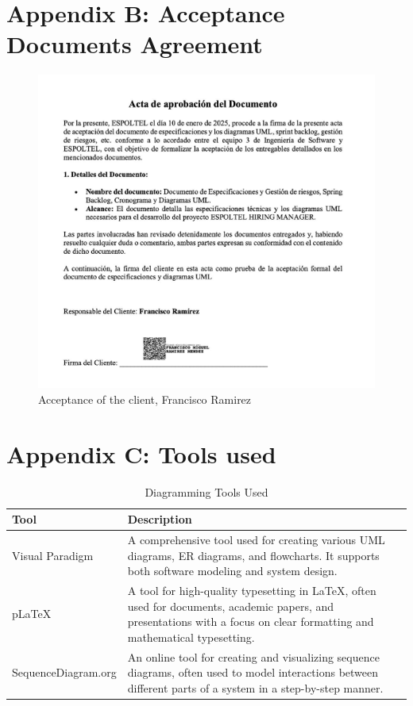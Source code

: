 \documentclass{scrreprt}
\begin{document}
\section{Appendix B: Acceptance Documents Agreement}
 \begin{figure}[H]
 	\centering  \small
 	\includegraphics[width=\textwidth]{Acceptance.jpeg} 
 	\caption{Acceptance of the client, Francisco Ramirez}
 	\label{fig:Acceptance}
 \end{figure}
\FloatBarrier 
\section{Appendix C: Tools used}
\begin{table}[H]
	\centering
	\begin{tabular}{|p{5cm}|p{5cm}|}
		\hline
		\textbf{Tool} & \textbf{Description} \\ \hline
		Visual Paradigm & A comprehensive tool used for creating various UML diagrams, ER diagrams, and flowcharts. It supports both software modeling and system design. \\ \hline
		pLaTeX & A tool for high-quality typesetting in LaTeX, often used for documents, academic papers, and presentations with a focus on clear formatting and mathematical typesetting. \\ \hline
		SequenceDiagram.org & An online tool for creating and visualizing sequence diagrams, often used to model interactions between different parts of a system in a step-by-step manner. \\ \hline
	\end{tabular}
	\caption{Diagramming Tools Used}
	\label{table:DiagrammingTools}
\end{table}
\end{document}
